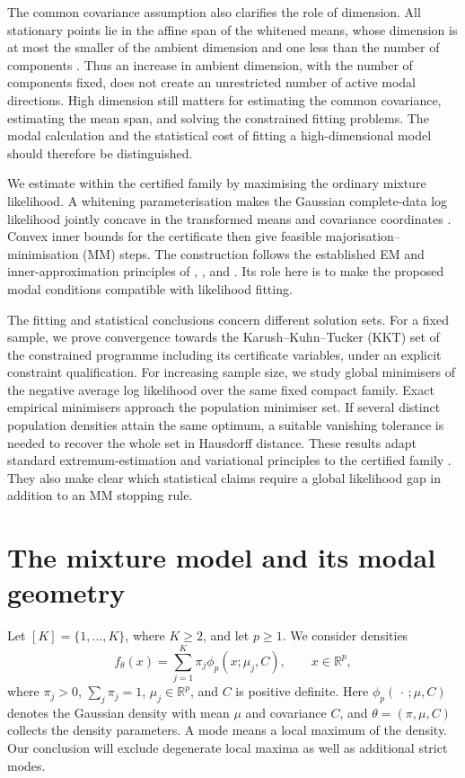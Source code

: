 \documentclass[12pt,a4paper]{article}
\theoremstyle{remark}
\newcommand{\R}{\mathbb R}
\begin{document}
The common covariance assumption also clarifies the role of dimension. All stationary points lie in the affine span of the whitened means, whose dimension is at most the smaller of the ambient dimension and one less than the number of components \citep{ray2005}. Thus an increase in ambient dimension, with the number of components fixed, does not create an unrestricted number of active modal directions. High dimension still matters for estimating the common covariance, estimating the mean span, and solving the constrained fitting problems. The modal calculation and the statistical cost of fitting a high-dimensional model should therefore be distinguished.

We estimate within the certified family by maximising the ordinary mixture likelihood. A whitening parameterisation makes the Gaussian complete-data log likelihood jointly concave in the transformed means and covariance coordinates \citep{barratt2023}. Convex inner bounds for the certificate then give feasible majorisation--minimisation (MM) steps. The construction follows the established EM and inner-approximation principles of \citet{dempster1977}, \citet{wu1983}, and \citet{scutari2016}. Its role here is to make the proposed modal conditions compatible with likelihood fitting.

The fitting and statistical conclusions concern different solution sets. For a fixed sample, we prove convergence towards the Karush--Kuhn--Tucker (KKT) set of the constrained programme including its certificate variables, under an explicit constraint qualification. For increasing sample size, we study global minimisers of the negative average log likelihood over the same fixed compact family. Exact empirical minimisers approach the population minimiser set. If several distinct population densities attain the same optimum, a suitable vanishing tolerance is needed to recover the whole set in Hausdorff distance. These results adapt standard extremum-estimation and variational principles to the certified family \citep{newey1994,rockafellar1998}. They also make clear which statistical claims require a global likelihood gap in addition to an MM stopping rule.

\section{The mixture model and its modal geometry}\label{sec:geometry}

Let $[K]=\{1,\ldots,K\}$, where $K\ge2$, and let $p\ge1$. We consider densities
\begin{equation}\label{eq:mixture}
 f_\theta(x)=\sum_{j=1}^K\pi_j\phi_p(x;\mu_j,C),
 \qquad x\in\R^p,
\end{equation}
where $\pi_j>0$, $\sum_j\pi_j=1$, $\mu_j\in\R^p$, and $C$ is positive definite. Here $\phi_p(\,\cdot\,;\mu,C)$ denotes the Gaussian density with mean $\mu$ and covariance $C$, and $\theta=(\pi,\mu,C)$ collects the density parameters. A mode means a local maximum of the density. Our conclusion will exclude degenerate local maxima as well as additional strict modes.
\end{document}
